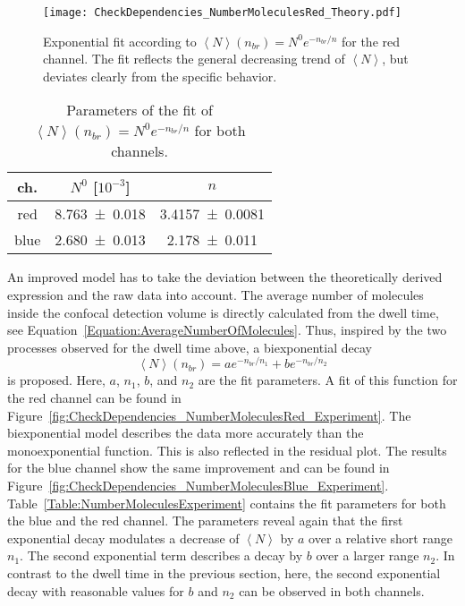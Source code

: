 \begin{figure}[h!]
	\centering
	\texttt{[image: CheckDependencies\_NumberMoleculesRed\_Theory.pdf]}
	\caption[Exponential fit of molecule number for red channel]{Exponential fit according to $\left\langle N \right\rangle (n_{br}) = N^0e^{-n_{br}/ n}$ for the red channel. The fit reflects the general decreasing trend of $\left\langle N \right\rangle$, but deviates clearly from the specific behavior.}
	\label{fig:CheckDependencies_NumberMoleculesRed_Theory}
\end{figure}

\begin{table}[h!]
	\centering
	\begin{tabular}{c|c|c} 
		ch. & $N^0$ [$10^{-3}$] & $n$ \\
		\hline
		red & \num{8.763 +- 0.018} & \num{3.4157 +- 0.0081} \\
		blue & \num{2.680 +- 0.013} & \num{2.178 +- 0.011} \\
	\end{tabular}
	\caption[Parameters of exponential fit of molecule number]{Parameters of the fit of $\left\langle N \right\rangle (n_{br}) = N^0e^{-n_{br}/ n}$ for both channels.}
	\label{Table:NumberMoleculesTheory}
\end{table}
\clearpage
An improved model has to take the deviation between the theoretically derived expression and the raw data into account. The average number of molecules inside the confocal detection volume is directly calculated from the dwell time, see Equation~\eqref{Equation:AverageNumberOfMolecules}. Thus, inspired by the two processes observed for the dwell time above, a biexponential decay 
\begin{equation}
	\left\langle N \right\rangle (n_{br}) = ae^{-n_{br}/ n_1} + be^{-n_{br}/ n_2}
\end{equation}
is proposed. Here, $a$, $n_1$, $b$, and $n_2$ are the fit parameters. A fit of this function for the red channel can be found in Figure~\ref{fig:CheckDependencies_NumberMoleculesRed_Experiment}. The biexponential model describes the data more accurately than the monoexponential function. This is also reflected in the residual plot. The results for the blue channel show the same improvement and can be found in Figure~\ref{fig:CheckDependencies_NumberMoleculesBlue_Experiment}. Table~\ref{Table:NumberMoleculesExperiment} contains the fit parameters for both the blue and the red channel. The parameters reveal again that the first exponential decay modulates a decrease of $\left\langle N \right\rangle$ by $a$ over a relative short range $n_1$. The second exponential term describes a decay by $b$ over a larger range $n_2$. In contrast to the dwell time in the previous section, here, the second exponential decay with reasonable values for $b$ and $n_2$ can be observed in both channels.

